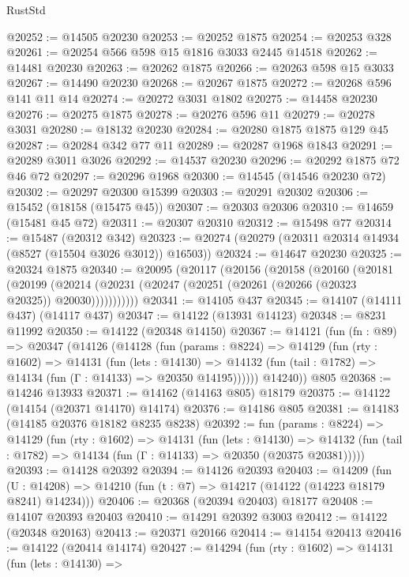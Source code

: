 \begin{lexlean}{RustStd}
\begin{coremodule}
@20252 := @14505 @20230
@20253 := @20252 @1875
@20254 := @20253 @328
@20261 := @20254 @566 @598 @15 @1816 @3033 @2445 @14518
@20262 := @14481 @20230
@20263 := @20262 @1875
@20266 := @20263 @598 @15 @3033
@20267 := @14490 @20230
@20268 := @20267 @1875
@20272 := @20268 @596 @141 @11 @14
@20274 := @20272 @3031 @1802
@20275 := @14458 @20230
@20276 := @20275 @1875
@20278 := @20276 @596 @11
@20279 := @20278 @3031
@20280 := @18132 @20230
@20284 := @20280 @1875 @1875 @129 @45
@20287 := @20284 @342 @77 @11
@20289 := @20287 @1968 @1843
@20291 := @20289 @3011 @3026
@20292 := @14537 @20230
@20296 := @20292 @1875 @72 @46 @72
@20297 := @20296 @1968
@20300 := @14545 (@14546 @20230 @72)
@20302 := @20297 @20300 @15399
@20303 := @20291 @20302
@20306 := @15452 (@18158 (@15475 @45))
@20307 := @20303 @20306
@20310 := @14659 (@15481 @45 @72)
@20311 := @20307 @20310
@20312 := @15498 @77
@20314 := @15487 (@20312 @342)
@20323 := @20274 (@20279 (@20311 @20314 @14934 (@8527 (@15504 @3026 @3012)) @16503))
@20324 := @14647 @20230
@20325 := @20324 @1875
@20340 := @20095
    (@20117
      (@20156
        (@20158
          (@20160
            (@20181
              (@20199
                (@20214 (@20231 (@20247 (@20251 (@20261 (@20266 (@20323 @20325)) @20030)))))))))))
@20341 := @14105 @437
@20345 := @14107 (@14111 @437) (@14117 @437)
@20347 := @14122 (@13931 @14123)
@20348 := @8231 @11992
@20350 := @14122 (@20348 @14150)
@20367 := @14121
    (fun (fn : @89) =>
    @20347
      (@14126
        (@14128
          (fun (params : @8224) =>
          @14129
            (fun (rty : @1602) =>
            @14131
              (fun (lets : @14130) =>
              @14132 (fun (tail : @1782) => @14134 (fun (Γ : @14133) => @20350 @14195))))))
        @14240))
    @805
@20368 := @14246 @13933
@20371 := @14162 (@14163 @805) @18179
@20375 := @14122 (@14154 (@20371 @14170) @14174)
@20376 := @14186 @805
@20381 := @14183 (@14185 @20376 @18182 @8235 @8238)
@20392 := fun (params : @8224) =>
  @14129
    (fun (rty : @1602) =>
    @14131
      (fun (lets : @14130) =>
      @14132 (fun (tail : @1782) => @14134 (fun (Γ : @14133) => @20350 (@20375 @20381)))))
@20393 := @14128 @20392
@20394 := @14126 @20393
@20403 := @14209
    (fun (U : @14208) => @14210 (fun (t : @7) => @14217 (@14122 (@14223 @18179 @8241) @14234)))
@20406 := @20368 (@20394 @20403) @18177
@20408 := @14107 @20393 @20403
@20410 := @14291 @20392 @3003
@20412 := @14122 (@20348 @20163)
@20413 := @20371 @20166
@20414 := @14154 @20413
@20416 := @14122 (@20414 @14174)
@20427 := @14294
    (fun (rty : @1602) =>
    @14131
      (fun (lets : @14130) =>

\end{coremodule}
\end{lexlean}
